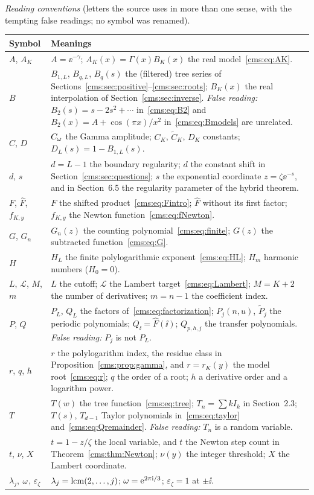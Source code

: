 \medskip
\begingroup\small
\noindent\emph{Reading conventions} (letters the source uses in more than one
sense, with the tempting false readings; no symbol was renamed).\par\smallskip
\renewcommand{\arraystretch}{1.1}
\noindent\begin{longtable}{@{}>{\raggedright\arraybackslash}p{0.95in}>{\raggedright\arraybackslash}p{5.3in}@{}}
\toprule
Symbol & Meanings\\
\midrule
$A$, $A_K$ & $A=\ee^{-\gamma}$; $A_K(x)=\Gamma(x)B_K(x)$ the real model~\eqref{cms:eq:AK}.\\
$B$ & $B_{1,L}$, $B_{q,L}$, $B_q(s)$ the (filtered) tree series of Sections~\ref{cms:sec:positive}--\ref{cms:sec:roots}; $B_K(x)$ the real interpolation of Section~\ref{cms:sec:inverse}. \emph{False reading:} $B_2(s)=s-2s^2+\cdots$ in~\eqref{cms:eq:B2} and $B_2(x)=A+\cos(\pi x)/x^2$ in~\eqref{cms:eq:Bmodels} are unrelated.\\
$C$, $D$ & $C_\omega$ the Gamma amplitude; $C_K$, $\widetilde C_K$, $D_K$ constants; $D_L(s)=1-B_{1,L}(s)$.\\
$d$, $s$ & $d=L-1$ the boundary regularity; $d$ the constant shift in Section~\ref{cms:sec:questions}; $s$ the exponential coordinate $z=\zeta\ee^{-s}$, and in Section~6.5 the regularity parameter of the hybrid theorem.\\
$F$, $\widehat F$, $f_{K,y}$ & $F$ the shifted product~\eqref{cms:eq:Fintro}; $\widehat F$ without its first factor; $f_{K,y}$ the Newton function~\eqref{cms:eq:fNewton}.\\
$G$, $G_n$ & $G_n(z)$ the counting polynomial~\eqref{cms:eq:finite}; $G(z)$ the subtracted function~\eqref{cms:eq:G}.\\
$H$ & $H_L$ the finite polylogarithmic exponent~\eqref{cms:eq:HL}; $H_m$ harmonic numbers ($H_0=0$).\\
$L$, $\mathcal L$, $M$, $m$ & $L$ the cutoff; $\mathcal L$ the Lambert target~\eqref{cms:eq:Lambert}; $M=K+2$ the number of derivatives; $m=n-1$ the coefficient index.\\
$P$, $Q$ & $P_L$, $Q_L$ the factors of~\eqref{cms:eq:factorization}; $P_j(n,u)$, $\widetilde P_j$ the periodic polynomials; $Q_{\ii}=\widehat F(\ii)$; $Q_{p,h,j}$ the transfer polynomials. \emph{False reading:} $P_j$ is not $P_L$.\\
$r$, $q$, $h$ & $r$ the polylogarithm index, the residue class in Proposition~\ref{cms:prop:gamma}, and $r=r_K(y)$ the model root~\eqref{cms:eq:r}; $q$ the order of a root; $h$ a derivative order and a logarithm power.\\
$T$ & $T(w)$ the tree function~\eqref{cms:eq:tree}; $T_n=\sum kI_k$ in Section~2.3; $T(s)$, $T_{d-1}$ Taylor polynomials in~\eqref{cms:eq:taylor} and~\eqref{cms:eq:Qremainder}. \emph{False reading:} $T_n$ is a random variable.\\
$t$, $\nu$, $X$ & $t=1-z/\zeta$ the local variable, and $t$ the Newton step count in Theorem~\ref{cms:thm:Newton}; $\nu(y)$ the integer threshold; $X$ the Lambert coordinate.\\
$\lambda_j$, $\omega$, $\varepsilon_\zeta$ & $\lambda_j=\operatorname{lcm}(2,\ldots,j)$; $\omega=\mathrm e^{2\pi\mathrm i/3}$; $\varepsilon_\zeta=1$ at $\pm\ii$.\\
\bottomrule
\end{longtable}
